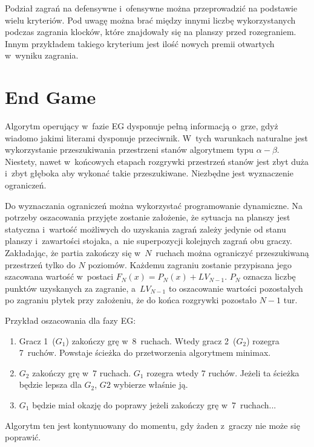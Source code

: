 \documentclass[a4paper,twocolumn,11pt]{article}
\theoremstyle{definition}
\begin{document}
Podział zagrań na defensywne i~ofensywne można przeprowadzić na podstawie wielu kryteriów. Pod uwagę można brać między innymi liczbę wykorzystanych podczas zagrania klocków, które znajdowały się na planszy przed rozegraniem. Innym przykładem takiego kryterium jest ilość nowych premii otwartych w~wyniku zagrania.

\section{End Game}

Algorytm operujący w~fazie EG dysponuje pełną informacją o~grze, gdyż wiadomo jakimi literami dysponuje przeciwnik. W~tych warunkach naturalne jest wykorzystanie przeszukiwania przestrzeni stanów algorytmem typu $\alpha - \beta$. Niestety, nawet w~końcowych etapach rozgrywki przestrzeń stanów jest zbyt duża i~zbyt głęboka aby wykonać takie przeszukiwane. Niezbędne jest wyznaczenie ograniczeń.

Do wyznaczania ograniczeń można wykorzystać programowanie dynamiczne. Na potrzeby oszacowania przyjęte zostanie założenie, że sytuacja na planszy jest statyczna i~wartość możliwych do uzyskania zagrań zależy jedynie od stanu planszy i~zawartości stojaka, a~nie superpozycji kolejnych zagrań obu graczy. Zakładając, że partia zakończy się w~$N$~ruchach można ograniczyć przeszukiwaną przestrzeń tylko do $N$ poziomów. Każdemu zagraniu zostanie przypisana jego szacowana wartość w~postaci $F_{N}(x) = P_{N}(x) + LV_{N-1}$. $P_{N}$ oznacza liczbę punktów uzyskanych za zagranie, a~$LV_{N-1}$ to oszacowanie wartości pozostałych po zagraniu płytek przy założeniu, że do końca rozgrywki pozostało $N - 1$ tur.

Przykład oszacowania dla fazy EG:

\begin{enumerate}
	\item Gracz 1~($G_{1}$) zakończy grę w~8~ruchach. Wtedy gracz 2~($G_{2}$) rozegra 7~ruchów. Powstaje ścieżka do przetworzenia algorytmem minimax.
	\item $G_{2}$ zakończy grę w~7 ruchach. $G_{1}$ rozegra wtedy 7 ruchów. Jeżeli ta ścieżka będzie lepsza dla $G_{2}$, $G{2}$ wybierze właśnie ją.
	\item $G_{1}$ będzie miał okazję do poprawy jeżeli zakończy grę w~7~ruchach...
\end{enumerate}

Algorytm ten jest kontynuowany do momentu, gdy żaden z~graczy nie może się poprawić.
\end{document}
